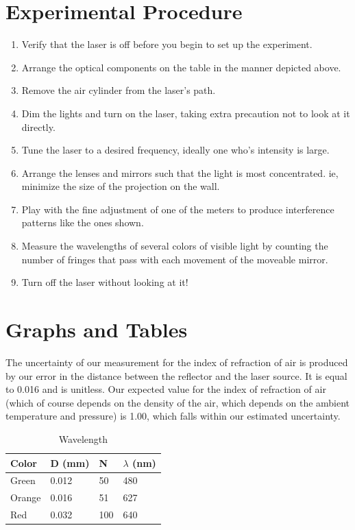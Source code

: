 \documentclass{amsart}
\begin{document}
\section{Experimental Procedure}
\begin{enumerate}
\item Verify that the laser is off before you begin to set up the experiment.
\item Arrange the optical components on the table in the manner depicted above.
\item Remove the air cylinder from the laser's path.
\item Dim the lights and turn on the laser, taking extra precaution not to look at it directly.
\item Tune the laser to a desired frequency, ideally one who's intensity is large.
\item Arrange the lenses and mirrors such that the light is most concentrated. ie, minimize the size of the projection on the wall.
\item Play with the fine adjustment of one of the meters to produce interference patterns like the ones shown.
\item Measure the wavelengths of several colors of visible light by counting the number of fringes that pass with each movement of the moveable mirror.
\item Turn off the laser without looking at it!
\end{enumerate}
\vfill
\section{Graphs and Tables}

The uncertainty of our measurement for the index of refraction of air is produced by our error in the distance between the reflector and the laser source. It is equal to 0.016 and is unitless. Our expected value for the index of refraction of air (which of course depends on the density of the air, which depends on the ambient temperature and pressure) is 1.00, which falls within our estimated uncertainty.

\begin{table}[H]
    \centering
    \caption{Wavelength}
    \label{my-label}
    \begin{tabular}{@{}llll@{}}\toprule
        Color  & D (mm) & N   & $\lambda$ (nm)      \\ \midrule
        Green  & 0.012  & 50  & 480         \\
        Orange & 0.016  & 51  & 627 \\
        Red    & 0.032  & 100 & 640 \\
        \bottomrule
    \end{tabular}
\end{table}
\end{document}
